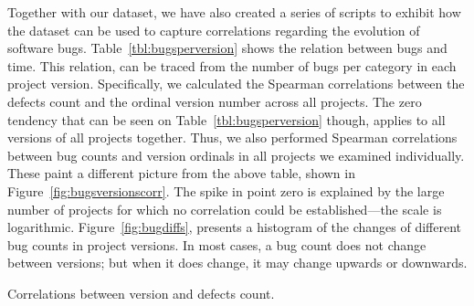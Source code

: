 \documentclass{sig-alternate}
\begin{document}
Together with our dataset, we have also created a series of
scripts to exhibit how the dataset can be used
to capture correlations regarding
the evolution of software bugs.
Table~\ref{tbl:bugsperversion} shows the relation between
bugs and time. This relation, can be traced from the number of
bugs per category in each project version. Specifically, we
calculated the Spearman correlations between the defects
count and the ordinal version number across all projects.
The zero tendency that can be seen on Table~\ref{tbl:bugsperversion}
though, applies to all versions of all projects together.
Thus, we also performed Spearman correlations between bug counts and version
ordinals in all projects we examined individually. These paint a different picture
from the above table, shown in Figure~\ref{fig:bugsversionscorr}. The
spike in point zero is explained by the large number of projects for
which no correlation could be established---the scale is
logarithmic.
Figure~\ref{fig:bugdiffs}, presents a histogram of the changes
of different bug counts in
project versions. In most cases, a bug count does not change between
versions; but when it does change, it may change upwards or downwards.

\begin{table}[tphp]
    \centering
        
	\caption{Correlations between version and defects count.}
    \label{tbl:bugsperversion}
\end{table}
\end{document}
